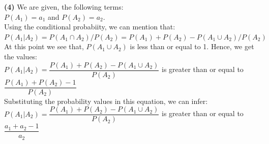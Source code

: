 \documentclass[11pt]{article}
\renewcommand\part[1]{\vspace{.10in}\textbf{(#1)}}
\begin{document}
\part{4}
We are given, the following terms:\\ 
$P(A_1) = a_1$ and $P(A_2) = a_2$.\\
Using the conditional probabiity, we can mention that:\\ 
$P(A_1 | A_2) = {P(A_1 \cap A_2)}/{P(A_2)} = {P(A_1) + P(A_2) - P(A_1 \cup A_2)}/{P(A_2)}$\\
At this point we see that, $P(A_1 \cup A_2)$ is less than or equal to 1. Hence, we get the values:\\
$P(A_1 | A_2) = \dfrac{P(A_1) + P(A_2) - P(A_1 \cup A_2)}{P(A_2)}$ is greater than or equal to $\dfrac{P(A_1) + P(A_2) - 1}{P(A_2)}$\\
Substituting the probability values in this equation, we can infer:\\
$P(A_1 | A_2) = \dfrac{P(A_1) + P(A_2) - P(A_1 \cup A_2)}{P(A_2)}$ is greater than or equal to $\dfrac{a_1 + a_2 - 1}{a_2}$\\
\end{document}
